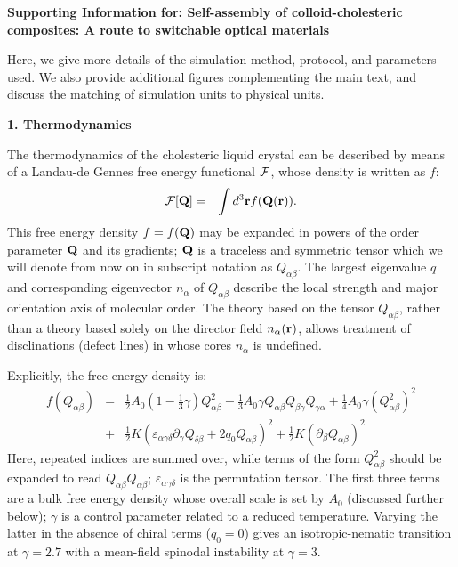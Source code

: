 \documentclass[12pt,twoside]{article}
\begin{document}
{\bf Supporting Information for: Self-assembly of colloid-cholesteric composites: A route to switchable optical materials}

Here, we give more details of the simulation method, protocol, and parameters used. We also provide additional figures complementing the main text, and discuss the matching of simulation units to physical units. 

{\bf 1. Thermodynamics}

The thermodynamics of the cholesteric liquid crystal can be described
by means of a  Landau-de Gennes free energy functional $\cal F$,
whose density is written as $f$:
\begin{eqnarray}
{\cal F}[{\bf Q}]&=&\int d^3{\bf r} f({\bf Q}({\bf r})).
\end{eqnarray}
This free energy density $f = f({\bf Q})$ may be expanded in powers of the
order parameter ${\bf Q}$ and its gradients; ${\bf Q}$ is a traceless 
and symmetric tensor which we will denote from now on in subscript
notation as $Q_{\alpha\beta}$.
The largest eigenvalue $q$ and corresponding eigenvector $n_\alpha$
of $Q_{\alpha\beta}$ describe the local strength and major orientation axis
of molecular order.
The theory based on the tensor $Q_{\alpha\beta}$, rather than a theory based
solely
on the director field $n_\alpha ({\bf r})$, allows treatment of disclinations
(defect lines) in whose cores $n_\alpha$ is undefined.

Explicitly, the free energy density is:
\begin{eqnarray}
f(Q_{\alpha\beta}) &=& {\textstyle \frac{1}{2}} A_0
 \left(1- {\textstyle \frac{1}{3}}\gamma \right)Q^2_{\alpha \beta}
-{\textstyle \frac{1}{3}}A_0\gamma Q_{\alpha \beta} Q_{\beta \gamma}Q_{\gamma \alpha} 
+ {\textstyle \frac{1}{4}} A_0\gamma (Q^2_{\alpha \beta})^2  \nonumber\\
&+& {\textstyle \frac{1}{2}} K(\varepsilon_{\alpha \gamma \delta}
\partial_\gamma Q_{\delta \beta} + 2 q_0 Q_{\alpha \beta})^2
+ {\textstyle \frac{1}{2}} K (\partial_\beta Q_{\alpha \beta})^2
\label{free}
\end{eqnarray}
Here, repeated indices are summed over, while terms of the form
$Q^2_{\alpha\beta}$ should be expanded to read $Q_{\alpha\beta}Q_{\alpha\beta}$;
$\varepsilon_{\alpha\gamma\delta}$ is the permutation tensor.
The first three terms are a bulk free energy density whose overall scale
is set by $A_0$ (discussed further below); $\gamma$ is a control parameter
related to a reduced temperature. Varying the latter in the absence of
chiral terms ($q_0=0$) gives an isotropic-nematic transition at
$\gamma = 2.7$ with a mean-field spinodal instability at $\gamma = 3$.
\end{document}
